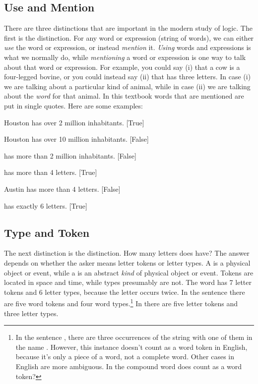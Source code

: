 \subsection{Use and Mention}\label{usemention}
There are three distinctions that are important in the modern study of logic. 
The first is the  distinction. 
For any word or expression (string of words), we can either \emph{use} the word or expression, or instead \emph{mention} it. 
\emph{Using} words and expressions is what we normally do, while \emph{mentioning} a word or expression is one way to talk about that word or expression. 
For example, you could say (i) that a cow is a four-legged bovine, or you could instead say (ii) that  has three letters. 
In case (i) we are talking about a particular kind of animal, while in case (ii) we are talking about the \emph{word} for that animal. 
In this textbook words that are mentioned are put in single quotes. Here are some examples:
\begin{menumerate}
\item Houston has over 2 million inhabitants. [True]
\item Houston has over 10 million inhabitants. [False]
\item {} has more than 2 million inhabitants. [False]
\item {} has more than 4 letters. [True]
\item Austin has more than 4 letters. [False]
\item\label{twentyeight}  has exactly 6 letters. [True]
\end{menumerate}

\subsection{Type and Token}\label{typetoken}
The next distinction is the  distinction. 
How many letters does  have?  The answer depends on whether the asker means letter tokens or letter types.
A  is a physical object or event, while a  is an abstract \emph{kind} of physical object or event. 
Tokens are located in space and time, while types presumably are not. 
The word  has 7 letter tokens and 6 letter types, because the letter  occurs twice.
In the sentence  there are five word tokens and four word types.\footnote{In the sentence , there are three occurrences of the string  with one of them in the name .  However, this instance doesn't count as a word token in English, because it's only a piece of a word, not a complete word.  Other cases in English are more ambiguous.  In the compound word  does  count as a word token?} 
In  there are five letter tokens and three letter types. 


